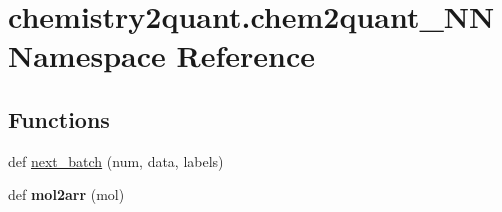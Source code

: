 \hypertarget{namespacechemistry2quant_1_1chem2quant__NN}{}\section{chemistry2quant.\+chem2quant\+\_\+\+NN Namespace Reference}
\label{namespacechemistry2quant_1_1chem2quant__NN}
\subsection*{Functions}
\begin{DoxyCompactItemize}
\item 
def \hyperlink{namespacechemistry2quant_1_1chem2quant__NN_afb055d34a228ae670b94588087aa897e}{next\+\_\+batch} (num, data, labels)
\item 
\mbox{\label{namespacechemistry2quant_1_1chem2quant__NN_a2c65dfd32b269c8366de91ed1f094dda}} 
def {\bfseries mol2arr} (mol)
\end{DoxyCompactItemize}
